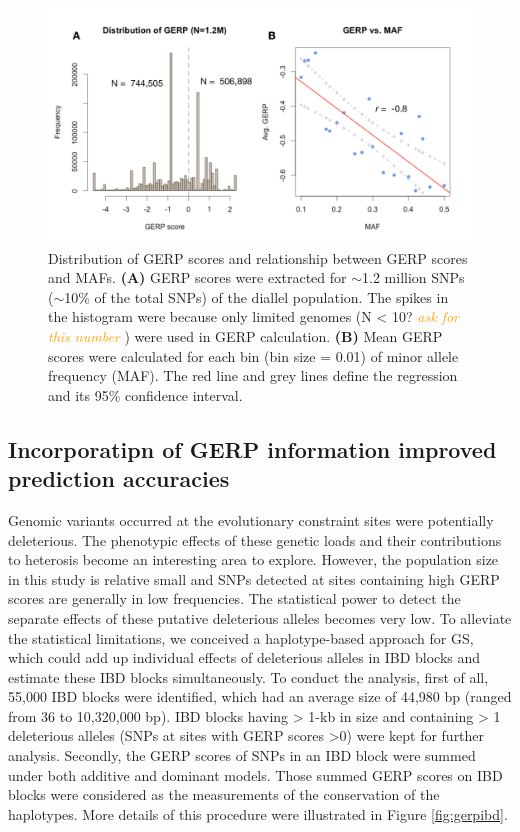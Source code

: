 \documentclass[9pt,twocolumn,twoside]{gsajnl}
\newcommand{\yang}[1]{\textcolor{orange}{\emph{\scriptsize  #1}} }
\begin{document}
\begin{figure}[htbp]
\centering
\includegraphics[width=\linewidth]{Figure_gerpmaf.pdf}
\caption{Distribution of GERP scores and relationship between GERP scores and MAFs. \textbf{(A)} GERP scores were extracted for $\sim$1.2 million SNPs ($\sim$10\% of the total SNPs) of the diallel population. The spikes in the histogram were because only limited genomes (N < 10? \yang{ask for this number}) were used in GERP calculation. \textbf{(B)} Mean GERP scores were calculated for each bin (bin size = 0.01) of minor allele frequency (MAF). The red line and grey lines define the regression and its 95\% confidence interval.}
\label{fig:gerpmaf}
\end{figure}


\subsection*{Incorporatipn of GERP information improved prediction accuracies}

Genomic variants occurred at the evolutionary constraint sites were potentially deleterious. The phenotypic effects of these genetic loads and their contributions to heterosis become an interesting area to explore. However, the population size in this study is relative small and SNPs detected at sites containing high GERP scores are generally in low frequencies. The statistical power to detect the separate effects of these putative deleterious alleles becomes very low. To alleviate the statistical limitations, we conceived a haplotype-based approach for GS, which could add up individual effects of deleterious alleles in IBD blocks and estimate these IBD blocks simultaneously. To conduct the analysis, first of all, 55,000 IBD blocks were identified, which had an average size of 44,980 bp (ranged from 36 to 10,320,000 bp). IBD blocks having > 1-kb in size and containing > 1 deleterious alleles (SNPs at sites with GERP scores >0) were kept for further analysis. Secondly, the GERP scores of SNPs in an IBD block were summed under both additive and dominant models. Those summed GERP scores on IBD blocks were considered as the measurements of the conservation of the haplotypes. More details of this procedure were illustrated in Figure \ref{fig:gerpibd}.      
\end{document}
